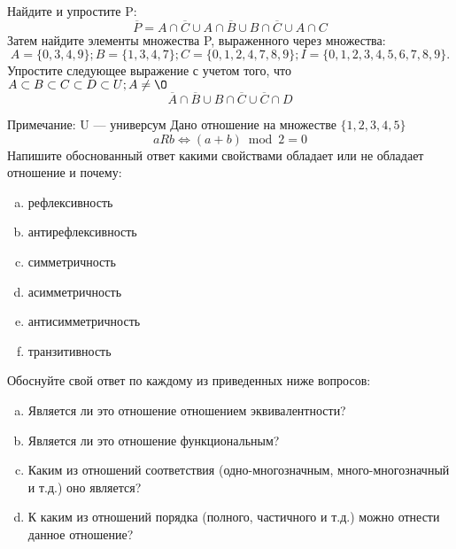 \documentclass[10pt]{exam}
\begin{document}
\begin{questions}
\question
Найдите и упростите P:
\begin{equation*}
\overline{P} = A \cap \overline{C} \cup A \cap \overline{B} \cup B \cap \overline{C} \cup A \cap C
\end{equation*}
Затем найдите элементы множества P, выраженного через множества:
\begin{equation*}
A = \{0, 3, 4, 9\}; 
B = \{1, 3, 4, 7\};
C = \{0, 1, 2, 4, 7, 8, 9\};
I = \{0, 1, 2, 3, 4, 5, 6, 7, 8, 9\}.
\end{equation*}\question
Упростите следующее выражение с учетом того, что $A\subset B \subset C \subset D \subset U; A \neq \O$
\begin{equation*}
\overline{A} \cap \overline{B} \cup B \cap \overline{C} \cup \overline{C} \cap D
\end{equation*}

Примечание: U — универсум\question
Дано отношение на множестве $\{1, 2, 3, 4, 5\}$ 
\begin{equation*}
aRb \iff (a+b) \bmod 2 =0
\end{equation*}
Напишите обоснованный ответ какими свойствами обладает или не обладает отношение и почему:   
\begin{enumerate} [a)]\setcounter{enumi}{0}
\item рефлексивность
\item антирефлексивность
\item симметричность
\item асимметричность
\item антисимметричность
\item транзитивность
\end{enumerate}

Обоснуйте свой ответ по каждому из приведенных ниже вопросов:
\begin{enumerate} [a)]\setcounter{enumi}{0}
    \item Является ли это отношение отношением эквивалентности?
    \item Является ли это отношение функциональным?
    \item Каким из отношений соответствия (одно-многозначным, много-многозначный и т.д.) оно является?
    \item К каким из отношений порядка (полного, частичного и т.д.) можно отнести данное отношение?
\end{enumerate}




\end{questions}
\end{document}
